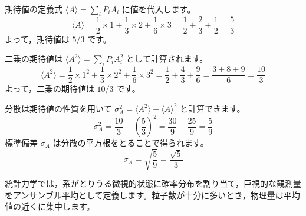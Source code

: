 \solutionheading
\begin{solutionparts}

期待値の定義式 $\langle A \rangle = \sum_i P_i A_i$ に値を代入します。
\begin{equation*}
\langle A \rangle = \frac{1}{2} \times 1 + \frac{1}{3} \times 2 + \frac{1}{6} \times 3 = \frac{1}{2} + \frac{2}{3} + \frac{1}{2} = \frac{5}{3}
\end{equation*}
よって，期待値は $5/3$ です。

二乗の期待値は $\langle A^2 \rangle = \sum_i P_i A_i^2$ として計算されます。
\begin{equation*}
\langle A^2 \rangle = \frac{1}{2} \times 1^2 + \frac{1}{3} \times 2^2 + \frac{1}{6} \times 3^2 = \frac{1}{2} + \frac{4}{3} + \frac{9}{6} = \frac{3 + 8 + 9}{6} = \frac{10}{3}
\end{equation*}
よって，二乗の期待値は $10/3$ です。

分散は期待値の性質を用いて $\sigma_A^2 = \langle A^2 \rangle - \langle A \rangle^2$ と計算できます。
\begin{equation*}
\sigma_A^2 = \frac{10}{3} - \left( \frac{5}{3} \right)^2 = \frac{30}{9} - \frac{25}{9} = \frac{5}{9}
\end{equation*}
標準偏差 $\sigma_A$ は分散の平方根をとることで得られます。
\begin{equation*}
\sigma_A = \sqrt{\frac{5}{9}} = \frac{\sqrt{5}}{3}
\end{equation*}

統計力学では，系がとりうる微視的状態に確率分布を割り当て，巨視的な観測量をアンサンブル平均として定義します。粒子数が十分に多いとき，物理量は平均値の近くに集中します。

\end{solutionparts}
